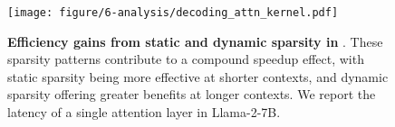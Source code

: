 \begin{figure}[t]
    \centering
    \texttt{[image: figure/6-analysis/decoding\_attn\_kernel.pdf]}
    \caption{\textbf{Efficiency gains from static and dynamic sparsity in \system}. These sparsity patterns contribute to a compound speedup effect, with static sparsity being more effective at shorter contexts, and dynamic sparsity offering greater benefits at longer contexts. We report the latency of a single attention layer in Llama-2-7B.}
    \label{fig:ana:decoding_attn_kernel}
\end{figure}
